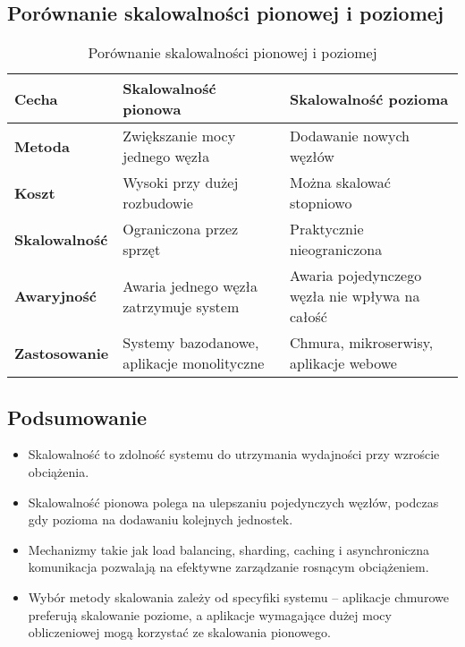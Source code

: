 \subsection{Porównanie skalowalności pionowej i poziomej}

\begin{table}[h]
    \centering
    \renewcommand{\arraystretch}{1.3} %
    \begin{tabularx}{\textwidth}{|l|X|X|}
        \hline
        \textbf{Cecha} & \textbf{Skalowalność pionowa} & \textbf{Skalowalność pozioma} \\
        \hline
        \textbf{Metoda} & Zwiększanie mocy jednego węzła & Dodawanie nowych węzłów \\
        \hline
        \textbf{Koszt} & Wysoki przy dużej rozbudowie & Można skalować stopniowo \\
        \hline
        \textbf{Skalowalność} & Ograniczona przez sprzęt & Praktycznie nieograniczona \\
        \hline
        \textbf{Awaryjność} & Awaria jednego węzła zatrzymuje system & Awaria pojedynczego węzła nie wpływa na całość \\
        \hline
        \textbf{Zastosowanie} & Systemy bazodanowe, aplikacje monolityczne & Chmura, mikroserwisy, aplikacje webowe \\
        \hline
    \end{tabularx}
    \caption{Porównanie skalowalności pionowej i poziomej}
\end{table}


\subsection{Podsumowanie}
\begin{itemize}
    \item Skalowalność to zdolność systemu do utrzymania wydajności przy wzroście obciążenia.
    \item Skalowalność pionowa polega na ulepszaniu pojedynczych węzłów, podczas gdy pozioma na dodawaniu kolejnych jednostek.
    \item Mechanizmy takie jak load balancing, sharding, caching i asynchroniczna komunikacja pozwalają na efektywne zarządzanie rosnącym obciążeniem.
    \item Wybór metody skalowania zależy od specyfiki systemu – aplikacje chmurowe preferują skalowanie poziome, a aplikacje wymagające dużej mocy obliczeniowej mogą korzystać ze skalowania pionowego.
\end{itemize}
